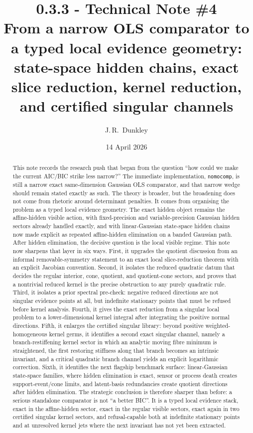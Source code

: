\documentclass[11pt,a4paper]{article}
\title{\textbf{0.3.3 - Technical Note \#4}\\
\large{From a narrow OLS comparator to a typed local evidence geometry: state-space hidden chains, exact slice reduction, kernel reduction, and certified singular channels}}
\author{J.\,R.~Dunkley}
\date{14 April 2026}
\numberwithin{equation}{section}
\theoremstyle{thmcompact}
\theoremstyle{remark}
\begin{document}
\maketitle

\begin{abstract}
This note records the research push that began from the question ``how could we make the current AIC/BIC strike less narrow?'' The immediate implementation, \texttt{nomocomp}, is still a narrow exact same-dimension Gaussian OLS comparator, and that narrow wedge should remain stated exactly as such. The theory is broader, but the broadening does not come from rhetoric around determinant penalties. It comes from organising the problem as a typed local evidence geometry. The exact hidden object remains the affine-hidden visible action, with fixed-precision and variable-precision Gaussian hidden sectors already handled exactly, and with linear-Gaussian state-space hidden chains now made explicit as repeated affine-hidden elimination on a banded Gaussian path. After hidden elimination, the decisive question is the local visible regime. This note now sharpens that layer in six ways. First, it upgrades the quotient discussion from an informal removable-symmetry statement to an exact local slice-reduction theorem with an explicit Jacobian convention. Second, it isolates the reduced quadratic datum that decides the regular interior, cone, quotient, and quotient-cone sectors, and proves that a nontrivial reduced kernel is the precise obstruction to any purely quadratic rule. Third, it isolates a prior spectral pre-check: negative reduced directions are not singular evidence points at all, but indefinite stationary points that must be refused before kernel analysis. Fourth, it gives the exact reduction from a singular local problem to a lower-dimensional kernel integral after integrating the positive normal directions. Fifth, it enlarges the certified singular library: beyond positive weighted-homogeneous kernel germs, it identifies a second exact singular channel, namely a branch-restiffening kernel sector in which an analytic moving fibre minimum is straightened, the first restoring stiffness along that branch becomes an intrinsic invariant, and a critical quadratic branch channel yields an explicit logarithmic correction. Sixth, it identifies the next flagship benchmark surface: linear-Gaussian state-space families, where hidden elimination is exact, sensor or process death creates support-event/cone limits, and latent-basis redundancies create quotient directions after hidden elimination. The strategic conclusion is therefore sharper than before: a serious standalone comparator is not ``a better BIC''. It is a typed local evidence stack, exact in the affine-hidden sector, exact in the regular visible sectors, exact again in two certified singular kernel sectors, and refusal-capable both at indefinite stationary points and at unresolved kernel jets where the next invariant has not yet been extracted.
\end{abstract}
\end{document}
